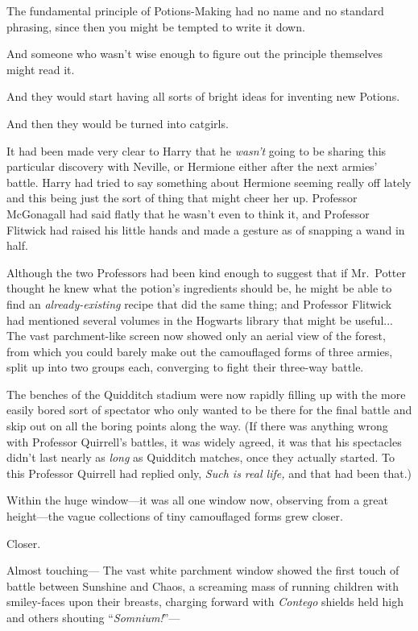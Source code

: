 The fundamental principle of Potions-Making had no name and no
standard phrasing, since then you might be tempted to write it
down.

And someone who wasn’t wise enough to figure out the principle
themselves might read it.

And they would start having all sorts of bright ideas for
inventing new Potions.

And then they would be turned into catgirls.

It had been made very clear to Harry that he \emph{wasn’t} going
to be sharing this particular discovery with Neville, or Hermione
either after the next armies’ battle. Harry had tried to say
something about Hermione seeming really off lately and this being
just the sort of thing that might cheer her up. Professor
McGonagall had said flatly that he wasn’t even to think it, and
Professor Flitwick had raised his little hands and made a gesture
as of snapping a wand in half.

Although the two Professors had been kind enough to suggest that
if Mr.~Potter thought he knew what the potion’s ingredients should
be, he might be able to find an \emph{already-existing} recipe that
did the same thing; and Professor Flitwick had mentioned several
volumes in the Hogwarts library that might be useful...
\sbreak
The vast parchment-like screen now showed only an aerial view of
the forest, from which you could barely make out the camouflaged
forms of three armies, split up into two groups each, converging to
fight their three-way battle.

The benches of the Quidditch stadium were now rapidly filling up
with the more easily bored sort of spectator who only wanted to be
there for the final battle and skip out on all the boring points
along the way. (If there was anything wrong with Professor
Quirrell’s battles, it was widely agreed, it was that his
spectacles didn’t last nearly as \emph{long} as Quidditch matches,
once they actually started. To this Professor Quirrell had replied
only, \emph{Such is real life,} and that had been that.)

Within the huge window—it was all one window now, observing
from a great height—the vague collections of tiny camouflaged
forms grew closer.

Closer.

Almost touching—
\sbreak
The vast white parchment window showed the first touch of battle
between Sunshine and Chaos, a screaming mass of running children
with smiley-faces upon their breasts, charging forward with
\emph{Contego} shields held high and others shouting
“\emph{Somnium!}”—


